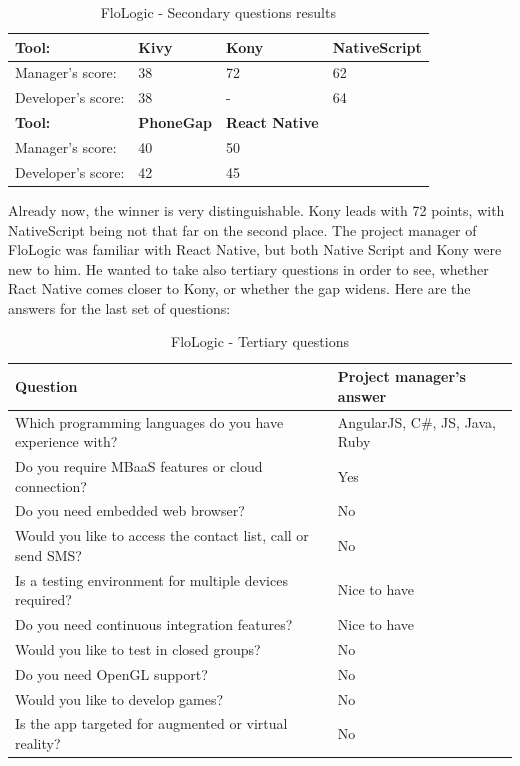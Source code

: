 \documentclass[english,master,public,dept460,male,cpdeclaration,oneside]{diploma}
\begin{document}
\begin{table}[!h]
	\centering
	\caption{FloLogic - Secondary questions results}	
	\begin{tabular}{p{4cm} | p{3cm} | p{3cm} | p{3cm}}
		\toprule		
		\textbf{Tool:} & \textbf{Kivy} & \textbf{Kony} & \textbf{NativeScript} \\
		\midrule
		Manager’s score: & 38 & 72 & 62 \\
		Developer’s score: & 38 & - & 64 \\ 
		\midrule
		\textbf{Tool:} & \textbf{PhoneGap} & \textbf{React Native} & \\
		\midrule
		Manager’s score: & 40 & 50 & \\
		Developer’s score: & 42 & 45 & \\			
		\midrule
	\end{tabular}
\end{table}

Already now, the winner is very distinguishable. Kony leads with 72 points, with NativeScript being not that far on the second place. The project manager of FloLogic was familiar with React Native, but both Native Script and Kony were new to him. He wanted to take also tertiary questions in order to see, whether Ract Native comes closer to Kony, or whether the gap widens. Here are the answers for the last set of questions:

\begin{table}[!h]
	\centering
	\caption{FloLogic - Tertiary questions}
	\begin{tabular}{p{9.5cm} | p{3cm}}
		\toprule		
		\textbf{Question} &	\textbf{Project manager’s answer} \\
		\midrule		
		Which programming languages do you have experience with? & AngularJS, C\#, JS, Java, Ruby \\
		Do you require MBaaS features or cloud connection? & Yes \\
		Do you need embedded web browser? & No \\
		Would you like to access the contact list, call or send SMS? & No \\
		Is a testing environment for multiple devices required? & Nice to have \\
		Do you need continuous integration features? & Nice to have \\
		Would you like to test in closed groups? & No \\
		Do you need OpenGL support? & No \\
		Would you like to develop games? & No \\
		Is the app targeted for augmented or virtual reality? & No \\			
		\midrule
	\end{tabular}
\end{table}
\end{document}
